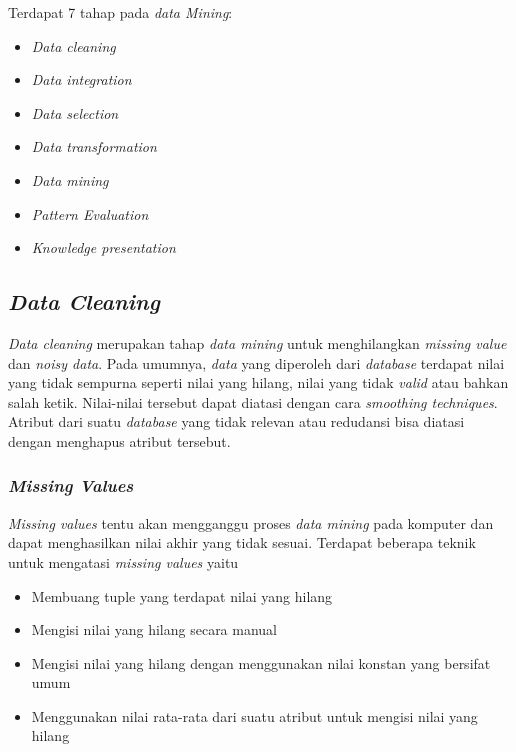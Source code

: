 Terdapat 7 tahap pada \textsl{data Mining}:
\begin{itemize}
	\item \textsl{Data cleaning}
	\item \textsl{Data integration}
	\item \textsl{Data selection}
	\item \textsl{Data transformation}
	\item \textsl{Data mining}
	\item \textsl{Pattern Evaluation}
	\item \textsl{Knowledge presentation}
\end{itemize}

\subsection{\textsl{Data Cleaning}}
\textsl{Data cleaning} merupakan tahap \textsl{data mining} untuk menghilangkan \textsl{missing value} dan \textsl{noisy data}. Pada umumnya, \textsl{data} yang diperoleh dari \textsl{database} terdapat nilai yang tidak sempurna seperti nilai yang hilang, nilai yang tidak \textsl{valid} atau bahkan salah ketik. Nilai-nilai tersebut dapat diatasi dengan cara \textsl{smoothing techniques}. Atribut dari suatu \textsl{database} yang tidak relevan atau redudansi bisa diatasi dengan menghapus atribut tersebut. 

\subsubsection{\textsl{Missing Values}}
\textsl{Missing values} tentu akan mengganggu proses \textsl{data mining} pada komputer dan dapat menghasilkan nilai akhir yang tidak sesuai. Terdapat beberapa teknik untuk mengatasi \textsl{missing values} yaitu
	\begin{itemize}
		\item Membuang tuple yang terdapat nilai yang hilang
		\item Mengisi nilai yang hilang secara manual
		\item Mengisi nilai yang hilang dengan menggunakan nilai konstan yang bersifat umum
		\item Menggunakan nilai rata-rata dari suatu atribut untuk mengisi nilai yang hilang
	\end{itemize}
